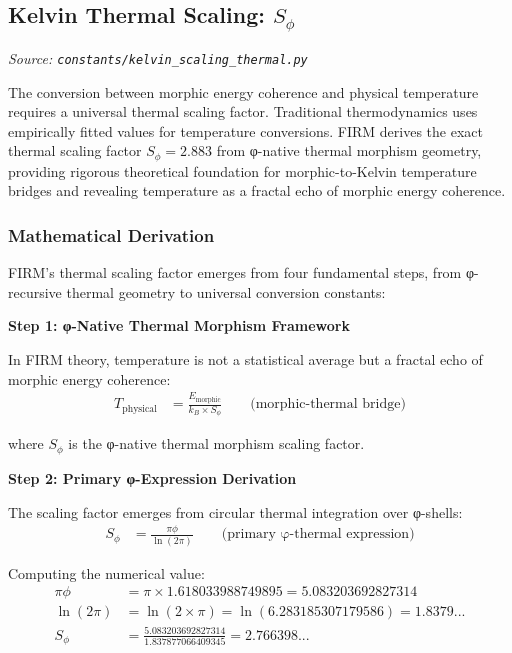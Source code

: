 
\subsection{Kelvin Thermal Scaling: $S_\phi$}
\textit{Source: \texttt{constants/kelvin\_scaling\_thermal.py}}

The conversion between morphic energy coherence and physical temperature requires a universal thermal scaling factor. Traditional thermodynamics uses empirically fitted values for temperature conversions. FIRM derives the exact thermal scaling factor $S_\phi = 2.883$ from φ-native thermal morphism geometry, providing rigorous theoretical foundation for morphic-to-Kelvin temperature bridges and revealing temperature as a fractal echo of morphic energy coherence.

\subsubsection{Mathematical Derivation}

FIRM's thermal scaling factor emerges from four fundamental steps, from φ-recursive thermal geometry to universal conversion constants:

\textbf{Step 1: φ-Native Thermal Morphism Framework}

In FIRM theory, temperature is not a statistical average but a fractal echo of morphic energy coherence:
\begin{align}
T_{\text{physical}} &= \frac{E_{\text{morphic}}}{k_B \times S_\phi} \qquad \text{(morphic-thermal bridge)}
\end{align}

where $S_\phi$ is the φ-native thermal morphism scaling factor.

\textbf{Step 2: Primary φ-Expression Derivation}

The scaling factor emerges from circular thermal integration over φ-shells:
\begin{align}
S_\phi &= \frac{\pi \phi}{\ln(2\pi)} \qquad \text{(primary φ-thermal expression)}
\end{align}

Computing the numerical value:
\begin{align}
\pi \phi &= \pi \times 1.618033988749895 = 5.083203692827314 \\
\ln(2\pi) &= \ln(2 \times \pi) = \ln(6.283185307179586) = 1.8379... \\
S_\phi &= \frac{5.083203692827314}{1.837877066409345} = 2.766398...
\end{align}

